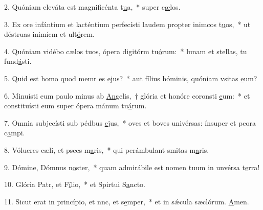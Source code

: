 2. Quóniam eleváta est magnificénta t\uline{u}a,~* super c\uline{æ}los.\par 
3. Ex ore infántium et lacténtium perfecísti laudem propter inimcos t\uline{u}os,~* ut déstruas inimícm et ult\uline{ó}rem.\par 
4. Quóniam vidébo cælos tuos, ópera digitórm tu\uline{ó}rum:~* lunam et stellas,  tu fund\uline{á}sti.\par 
5. Quid est homo quod memr es \uline{e}jus?~* aut fílius hóminis, quóniam vsitas \uline{e}um?\par 
6. Minuísti eum paulo minus ab \uline{An}gelis,~† glória et honóre coronsti \uline{e}um:~* et constituísti eum super ópera mánum tu\uline{á}rum.\par 
7. Omnia subjecísti sub pédbus \uline{e}jus,~* oves et boves univérsas: ínsuper et pcora c\uline{a}mpi.\par 
8. Vólucres cæli, et psces m\uline{a}ris,~* qui perámbulant smitas m\uline{a}ris.\par 
9. Dómine, Dómnus n\uline{o}ster,~* quam admirábile est nomen tuum in unvérsa t\uline{e}rra!\par 
10. Glória Patr, et F\uline{í}lio,~* et Spirtui S\uline{a}ncto.\par 
11. Sicut erat in princípio, et nnc, et s\uline{e}mper,~* et in sǽcula sæclórum. \uline{A}men.\par 
